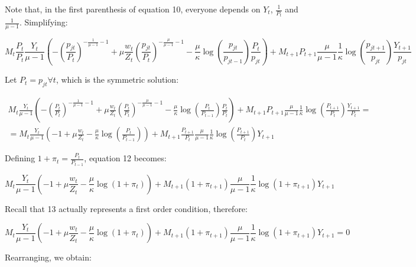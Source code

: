 \documentclass[a4paper,10pt]{article}
\begin{document}
	Note that, in the first parenthesis of equation 10, everyone depends on $Y_t$, $\frac{1}{P_t}$ and $\frac{1}{\mu -1}$. Simplifying:
	
	\begin{equation}
		M_t \frac{P_t}{P_t}\frac{Y_t}{\mu - 1} \left(-\left(\frac{p_{jt}}{P_t}\right)^{-\frac{1}{\mu-1}-1} + \mu\frac{w_t}{Z_t}\left(\frac{p_{jt}}{P_t}\right)^{-\frac{\mu}{\mu-1}-1} - \frac{\mu}{\kappa}\log\left(\frac{p_{jt}}{p_{jt-1}}\right) \frac{P_t}{p_{jt}}  \right) + M_{t+1}P_{t+1}\frac{\mu}{\mu-1}\frac{1}{\kappa}\log\left(\frac{p_{jt+1}}{p_{jt}}\right) \frac{Y_{t+1}}{p_{jt}}
	\end{equation}
	
	Let $P_t = p_{jt} \forall t$, which is the symmetric solution:
	
	\begin{gather}	
		M_t \frac{Y_t}{\mu - 1} \left(-\left(\frac{P_t}{P_t}\right)^{-\frac{1}{\mu-1}-1} + \mu\frac{w_t}{Z_t}\left(\frac{P_t}{P_t}\right)^{-\frac{\mu}{\mu-1}-1} - \frac{\mu}{\kappa}\log\left(\frac{P_{t}}{P_{t-1}}\right) \frac{P_t}{P_{t}}  \right) + M_{t+1}P_{t+1}\frac{\mu}{\mu-1}\frac{1}{\kappa}\log\left(\frac{P_{t+1}}{P_{t}}\right) \frac{Y_{t+1}}{P_{t}} = \nonumber \\
		= M_t \frac{Y_t}{\mu - 1} \left(-1 + \mu\frac{w_t}{Z_t} - \frac{\mu}{\kappa}\log\left(\frac{P_{t}}{P_{t-1}}\right)  \right) + M_{t+1}\frac{P_{t+1}}{P_t}\frac{\mu}{\mu-1}\frac{1}{\kappa}\log\left(\frac{P_{t+1}}{P_{t}}\right) Y_{t+1}
	\end{gather}

	Defining $1+\pi_t = \frac{P_t}{P_{t-1}}$, equation 12 becomes:
	
	\begin{equation}
		M_t \frac{Y_t}{\mu - 1} \left(-1 + \mu\frac{w_t}{Z_t} - \frac{\mu}{\kappa}\log\left(1+\pi_t\right)  \right) + M_{t+1}(1+\pi_{t+1})\frac{\mu}{\mu-1}\frac{1}{\kappa}\log\left(1+\pi_{t+1}\right) Y_{t+1}
	\end{equation}
	
	Recall that 13 actually represents a first order condition, therefore:
	
	\begin{equation}
		M_t \frac{Y_t}{\mu - 1} \left(-1 + \mu\frac{w_t}{Z_t} - \frac{\mu}{\kappa}\log\left(1+\pi_t\right)  \right) + M_{t+1}(1+\pi_{t+1})\frac{\mu}{\mu-1}\frac{1}{\kappa}\log\left(1+\pi_{t+1}\right) Y_{t+1} = 0
	\end{equation}

	Rearranging, we obtain:
	
\end{document}
